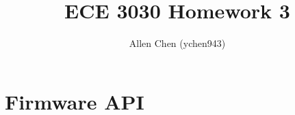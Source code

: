 \documentclass{article}
\begin{document}
\title{ECE 3030 Homework 3}
\author{Allen Chen (ychen943)}
  \newpage

\tableofcontents

\newpage
\section{Firmware API}
\end{document}
